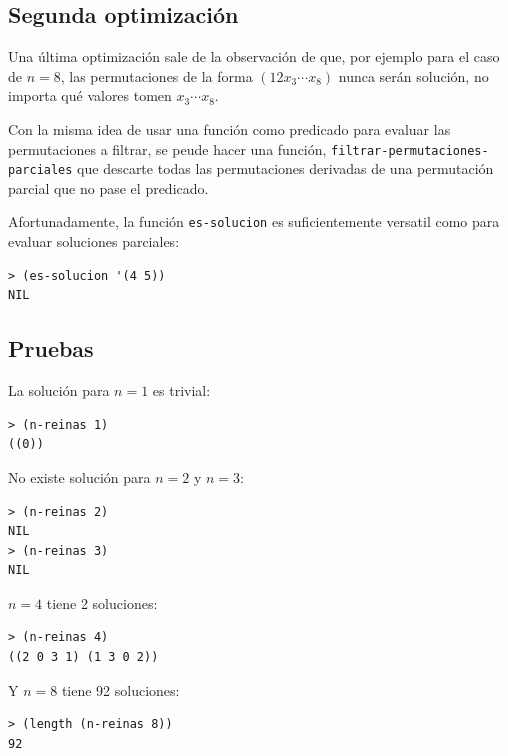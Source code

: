 \documentclass[12pt,titlepage]{article}
\begin{document}
\subsection{Segunda optimización}

Una última optimización sale de la observación de que, por ejemplo para el caso de $n=8$, las permutaciones de la forma $(1 2 x_3 \cdots x_8)$ nunca serán solución, no importa qué valores tomen $x_3 \cdots x_8$.

Con la misma idea de usar una función como predicado para evaluar las permutaciones a filtrar, se peude hacer una función, \lstinline|filtrar-permutaciones-parciales| que descarte todas las permutaciones derivadas de una permutación parcial que no pase el predicado.

Afortunadamente, la función \lstinline|es-solucion| es suficientemente versatil como para evaluar soluciones parciales:
\begin{lstlisting}
> (es-solucion '(4 5))
NIL
\end{lstlisting}



\subsection{Pruebas}

La solución para $n=1$ es trivial:
\begin{lstlisting}
> (n-reinas 1)
((0))
\end{lstlisting}

No existe solución para $n = 2$ y $n = 3$:
\begin{lstlisting}
> (n-reinas 2)
NIL
> (n-reinas 3)
NIL
\end{lstlisting}

$n=4$ tiene 2 soluciones:
\begin{lstlisting}
> (n-reinas 4)
((2 0 3 1) (1 3 0 2))
\end{lstlisting}

Y $n=8$ tiene 92 soluciones:
\begin{lstlisting}
> (length (n-reinas 8))
92
\end{lstlisting}

\end{document}
